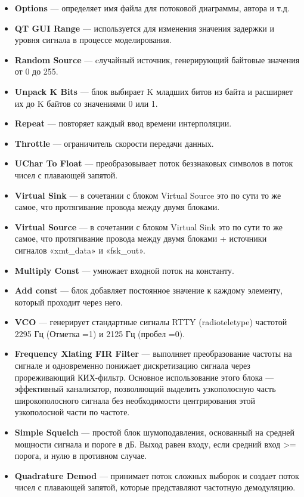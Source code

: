 \documentclass[12pt]{article}
\begin{document}
\begin{itemize}
	\item \textbf{Options} --- определяет имя файла для потоковой диаграммы, автора и т.д.
	\item \textbf{QT GUI Range} --- используется для изменения значения задержки и уровня сигнала в процессе моделирования.
	\item \textbf{Random Source} --- cлучайный источник, генерирующий байтовые значения от 0 до 255.
	\item \textbf{Unpack K Bits} --- блок выбирает K младших битов из байта и расширяет их до K байтов со значениями 0 или 1. 
	\item \textbf{Repeat} --- повторяет каждый ввод времени интерполяции.
	\item \textbf{Throttle} --- ограничитель скорости передачи данных.
	\item \textbf{UChar To Float} --- преобразовывает поток беззнаковых символов в поток чисел с плавающей запятой.
	\item \textbf{Virtual Sink} --- в сочетании с блоком Virtual Source это по сути то же самое, что протягивание провода между двумя блоками.
	\item \textbf{Virtual Source} --- в сочетании с блоком Virtual Sink это по сути то же самое, что протягивание провода между двумя блоками + источники сигналов «xmt\_data» и «fsk\_out».
	\item \textbf{Multiply Const} --- умножает входной поток на константу.
	\item \textbf{Add const} --- блок добавляет постоянное значение к каждому элементу, который проходит через него.
	\item \textbf{VCO} --- генерирует стандартные сигналы RTTY (radioteletype) частотой 2295 Гц (Отметка =1) и 2125 Гц (пробел =0).
	\item \textbf{Frequency Xlating FIR Filter} --- выполняет преобразование частоты на сигнале и одновременно понижает дискретизацию сигнала через прореживающий КИХ-фильтр. Основное использование этого блока — эффективный канализатор, позволяющий выделить узкополосную часть широкополосного сигнала без необходимости центрирования этой узкополосной части по частоте.
	\item \textbf{Simple Squelch} --- простой блок шумоподавления, основанный на средней мощности сигнала и пороге в дБ. Выход равен входу, если средний вход >= порога, и нулю в противном случае.
	\item \textbf{Quadrature Demod} --- принимает поток сложных выборок и создает поток чисел с плавающей запятой, которые представляют частотную демодуляцию.

\end{itemize}
\end{document}
